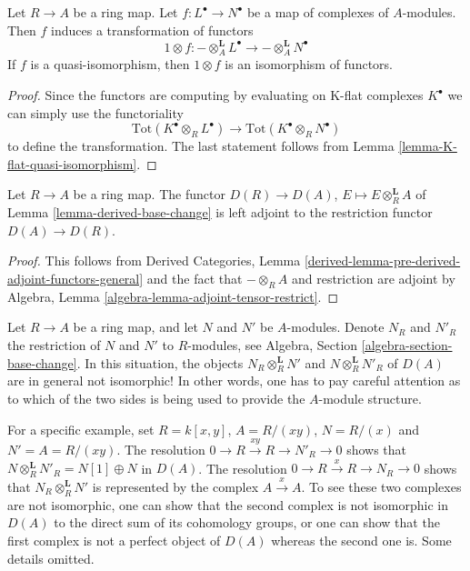 \begin{lemma}
\label{lemma-functoriality-derived-base-change}
Let $R \to A$ be a ring map. Let $f : L^\bullet \to N^\bullet$ be a
map of complexes of $A$-modules. Then $f$ induces a transformation
of functors
$$
1 \otimes f :
- \otimes_A^\mathbf{L} L^\bullet
\longrightarrow
- \otimes_A^\mathbf{L} N^\bullet
$$
If $f$ is a quasi-isomorphism, then $1 \otimes f$ is an isomorphism
of functors.
\end{lemma}

\begin{proof}
Since the functors are computing by evaluating on K-flat complexes
$K^\bullet$ we can simply use the functoriality
$$
\text{Tot}(K^\bullet \otimes_R L^\bullet) \to
\text{Tot}(K^\bullet \otimes_R N^\bullet)
$$
to define the transformation. The last statement follows from
Lemma \ref{lemma-K-flat-quasi-isomorphism}.
\end{proof}

\begin{lemma}
\label{lemma-tensor-hom-adjoint}
Let $R \to A$ be a ring map. The functor
$D(R) \to D(A)$, $E \mapsto E \otimes_R^\mathbf{L} A$
of Lemma \ref{lemma-derived-base-change}
is left adjoint to the restriction functor
$D(A) \to D(R)$.
\end{lemma}

\begin{proof}
This follows from Derived Categories, Lemma
\ref{derived-lemma-pre-derived-adjoint-functors-general}
and the fact that $- \otimes_R A$ and restriction are adjoint by
Algebra, Lemma \ref{algebra-lemma-adjoint-tensor-restrict}.
\end{proof}

\begin{remark}[Warning]
\label{remark-warning-compute-base-change}
Let $R \to A$ be a ring map, and let $N$ and $N'$ be $A$-modules.
Denote $N_R$ and $N'_R$ the restriction of $N$ and $N'$ to $R$-modules,
see Algebra, Section \ref{algebra-section-base-change}.
In this situation, the objects $N_R \otimes_R^\mathbf{L} N'$
and $N \otimes_R^\mathbf{L} N'_R$ of $D(A)$ are in general
not isomorphic! In other words, one has to pay careful attention
as to which of the two sides is being used to provide the
$A$-module structure.

\medskip\noindent
For a specific example, set $R = k[x, y]$, $A = R/(xy)$, $N = R/(x)$
and $N' = A = R/(xy)$. The resolution
$0 \to R \xrightarrow{xy} R \to N'_R \to 0$
shows that $N \otimes_R^\mathbf{L} N'_R = N[1] \oplus N$ in $D(A)$.
The resolution
$0 \to R \xrightarrow{x} R \to N_R \to 0$
shows that $N_R \otimes_R^\mathbf{L} N'$ is represented by
the complex $A \xrightarrow{x} A$. To see these two complexes
are not isomorphic, one can show that the second complex is
not isomorphic in $D(A)$ to the direct sum of its cohomology groups,
or one can show that the first complex is not a perfect object of $D(A)$
whereas the second one is. Some details omitted.
\end{remark}


